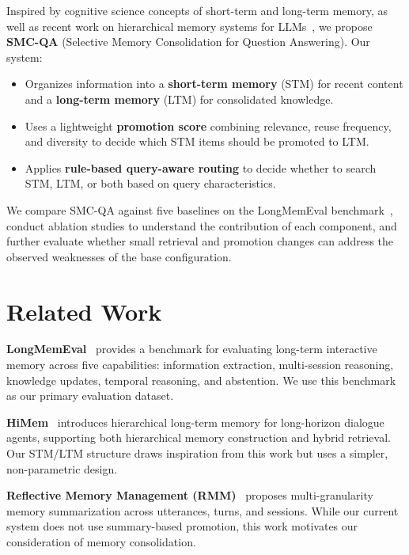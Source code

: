 \documentclass{article}
\begin{document}
Inspired by cognitive science concepts of short-term and long-term memory, as well as recent work on hierarchical memory systems for LLMs~\cite{himem, rmm, lightmem}, we propose \textbf{SMC-QA} (Selective Memory Consolidation for Question Answering). Our system:

\begin{itemize}
    \item Organizes information into a \textbf{short-term memory} (STM) for recent content and a \textbf{long-term memory} (LTM) for consolidated knowledge.
    \item Uses a lightweight \textbf{promotion score} combining relevance, reuse frequency, and diversity to decide which STM items should be promoted to LTM.
    \item Applies \textbf{rule-based query-aware routing} to decide whether to search STM, LTM, or both based on query characteristics.
\end{itemize}

We compare SMC-QA against five baselines on the LongMemEval benchmark~\cite{longmemeval}, conduct ablation studies to understand the contribution of each component, and further evaluate whether small retrieval and promotion changes can address the observed weaknesses of the base configuration.

\section{Related Work}

\textbf{LongMemEval}~\cite{longmemeval} provides a benchmark for evaluating long-term interactive memory across five capabilities: information extraction, multi-session reasoning, knowledge updates, temporal reasoning, and abstention. We use this benchmark as our primary evaluation dataset.

\textbf{HiMem}~\cite{himem} introduces hierarchical long-term memory for long-horizon dialogue agents, supporting both hierarchical memory construction and hybrid retrieval. Our STM/LTM structure draws inspiration from this work but uses a simpler, non-parametric design.

\textbf{Reflective Memory Management (RMM)}~\cite{rmm} proposes multi-granularity memory summarization across utterances, turns, and sessions. While our current system does not use summary-based promotion, this work motivates our consideration of memory consolidation.
\end{document}
